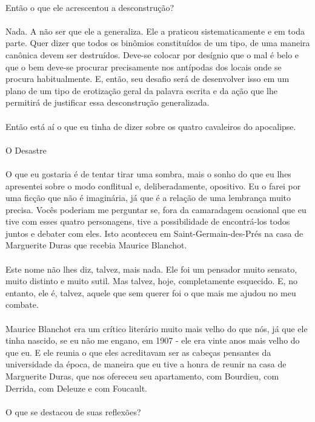 \documentclass[10pt,a4paper]{book}
\begin{document}
	\\
	Então o que ele acrescentou a desconstrução?\\
	\\
	Nada. A não ser que ele a generaliza. Ele a praticou sistematicamente e em toda parte. Quer dizer que todos os binômios constituídos de um tipo, de uma maneira canônica devem ser destruídos. Deve-se colocar por desígnio que o mal é belo e que o bem deve-se procurar precisamente nos antípodas dos locais onde se procura habitualmente. E, então, seu desafio será de desenvolver isso em um plano de um tipo de erotização geral da palavra escrita e da ação que lhe permitirá de justificar essa desconstrução generalizada.\\
	\\
	Então está aí o que eu tinha de dizer sobre os quatro cavaleiros do apocalipse.\\
	\\
	O Desastre\\
	\\
	O que eu gostaria é de tentar tirar uma sombra, mais o sonho do que eu lhes apresentei sobre o modo conflitual e, deliberadamente, opositivo. Eu o farei por uma ficção que não é imaginária, já que é a relação de uma lembrança muito precisa. Vocês poderiam me perguntar se, fora da camaradagem ocasional que eu tive com esses quatro personagens, tive a possibilidade de encontrá-los todos juntos e debater com eles. Isto aconteceu em Saint-Germain-des-Prés na casa de Marguerite Duras que recebia Maurice Blanchot.\\
	\\
	Este nome não lhes diz, talvez, mais nada. Ele foi um pensador muito sensato, muito distinto e muito sutil. Mas talvez, hoje, completamente esquecido. E, no entanto, ele é, talvez, aquele que sem querer foi o que mais me ajudou no meu combate. \\
	\\
	Maurice Blanchot era um crítico literário muito mais velho do que nós, já que ele tinha nascido, se eu não me engano, em 1907 - ele era vinte anos mais velho do que eu. E ele reunia o que eles acreditavam ser as cabeças pensantes da universidade da época, de maneira que eu tive a honra de reunir na casa de Marguerite Duras, que nos ofereceu seu apartamento, com Bourdieu, com Derrida, com Deleuze e com Foucault.\\
	\\
	O que se destacou de suas reflexões?\\
	\\
\end{document}

